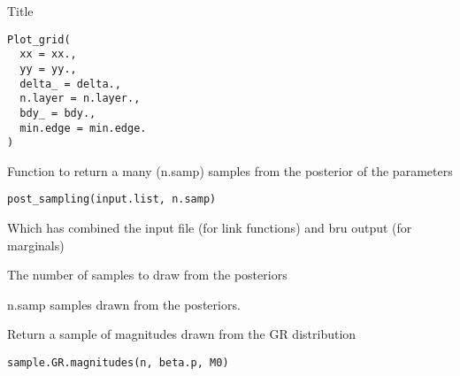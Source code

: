 \documentclass[letterpaper]{book}
\begin{document}
%
\begin{Description}\relax
Title
\end{Description}
%
\begin{Usage}
\begin{verbatim}
Plot_grid(
  xx = xx.,
  yy = yy.,
  delta_ = delta.,
  n.layer = n.layer.,
  bdy_ = bdy.,
  min.edge = min.edge.
)
\end{verbatim}
\end{Usage}
%
\begin{Arguments}
\begin{ldescription}
\item[\code{min.edge}] 
\end{ldescription}
\end{Arguments}
%
\begin{Description}\relax
Function to return a many (n.samp) samples from the posterior of the parameters
\end{Description}
%
\begin{Usage}
\begin{verbatim}
post_sampling(input.list, n.samp)
\end{verbatim}
\end{Usage}
%
\begin{Arguments}
\begin{ldescription}
\item[\code{input.list}] Which has combined the input file (for link functions) and bru output (for marginals)

\item[\code{n.samp}] The number of samples to draw from the posteriors
\end{ldescription}
\end{Arguments}
%
\begin{Value}
n.samp samples drawn from the posteriors.
\end{Value}
%
\begin{Description}\relax
Return a sample of magnitudes drawn from the GR distribution
\end{Description}
%
\begin{Usage}
\begin{verbatim}
sample.GR.magnitudes(n, beta.p, M0)
\end{verbatim}
\end{Usage}
\end{document}

